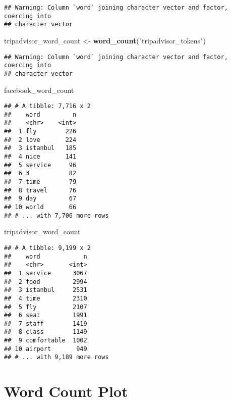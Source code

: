 \documentclass[]{article}
\newenvironment{Shaded}{\begin{snugshade}}{\end{snugshade}}
\newcommand{\KeywordTok}[1]{\textcolor[rgb]{0.13,0.29,0.53}{\textbf{#1}}}
\newcommand{\StringTok}[1]{\textcolor[rgb]{0.31,0.60,0.02}{#1}}
\newcommand{\NormalTok}[1]{#1}
\begin{document}
\begin{verbatim}
## Warning: Column `word` joining character vector and factor, coercing into
## character vector
\end{verbatim}

\begin{Shaded}
\begin{Highlighting}[]
\NormalTok{tripadvisor_word_count <-}\StringTok{ }\KeywordTok{word_count}\NormalTok{(}\StringTok{"tripadvisor_tokens"}\NormalTok{)}
\end{Highlighting}
\end{Shaded}

\begin{verbatim}
## Warning: Column `word` joining character vector and factor, coercing into
## character vector
\end{verbatim}

\begin{Shaded}
\begin{Highlighting}[]
\NormalTok{facebook_word_count}
\end{Highlighting}
\end{Shaded}

\begin{verbatim}
## # A tibble: 7,716 x 2
##    word         n
##    <chr>    <int>
##  1 fly        226
##  2 love       224
##  3 istanbul   185
##  4 nice       141
##  5 service     96
##  6 3           82
##  7 time        79
##  8 travel      76
##  9 day         67
## 10 world       66
## # ... with 7,706 more rows
\end{verbatim}

\begin{Shaded}
\begin{Highlighting}[]
\NormalTok{tripadvisor_word_count}
\end{Highlighting}
\end{Shaded}

\begin{verbatim}
## # A tibble: 9,199 x 2
##    word            n
##    <chr>       <int>
##  1 service      3067
##  2 food         2994
##  3 istanbul     2531
##  4 time         2310
##  5 fly          2107
##  6 seat         1991
##  7 staff        1419
##  8 class        1149
##  9 comfortable  1002
## 10 airport       949
## # ... with 9,189 more rows
\end{verbatim}

\section{Word Count Plot}\label{word-count-plot}
\end{document}
